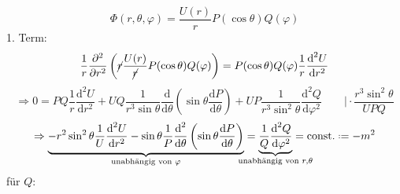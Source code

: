 $$\Phi(r,\theta,\varphi) = \frac{U(r)}{r} P(\cos\theta)Q(\varphi)$$
1. Term:
$$\frac{1}{r} \frac{\partial ^2}{\partial r^2} \left(\cancel{r} \frac{U(r)}{\cancel{r}} P(\cos\theta)Q(\varphi)\right) = P(\cos\theta)Q(\varphi)\frac{1}{r}\frac{\textrm{d}^2 U}{\textrm{d} r^2}$$
$$\Rightarrow 0 = PQ \frac{1}{r} \frac{\textrm{d}^2 U}{\textrm{d} r^2} + UQ \frac{1}{r^3 \sin \theta}\frac{\textrm{d}}{\textrm{d}\theta} \left(\sin\theta \frac{\textrm{d} P}{\textrm{d} \theta} \right) + UP \frac{1}{r^3 \sin^2 \theta} \frac{\textrm{d}^2 Q}{\textrm{d} \varphi^2} \qquad \bigg\rvert \cdot \frac{r^3 \sin^2 \theta}{UPQ}$$
$$\Rightarrow \underbrace{- r^2 \sin^2 \theta \frac{1}{U} \frac{\textrm{d}^2 U}{\textrm{d} r^2} - \sin \theta \frac{1}{P}\frac{\textrm{d}^2}{\textrm{d} \theta}\left( \sin \theta \frac{\textrm{d} P}{\textrm{d} \theta} \right)}_{\textrm{unabhängig von } \varphi} = \underbrace{\frac{1}{Q} \frac{\textrm{d}^2 Q}{\textrm{d} \varphi^2}}_{\mathclap{\textrm{unabhängig von }r,\theta}} = \const \defeq -m^2$$
für $Q$:

